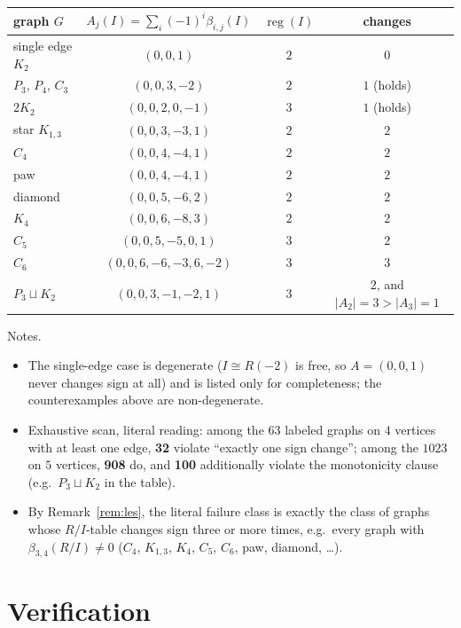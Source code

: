 \documentclass[11pt]{article}
\begin{document}
\begin{center}
\begin{tabular}{lccc}
\toprule
graph $G$ & $A_j(I)=\sum_i(-1)^i\beta_{i,j}(I)$ & $\operatorname{reg}(I)$ & changes \\
\midrule
single edge $K_2$ & $(0,0,1)$ & $2$ & $0$ \\
$P_3$, $P_4$, $C_3$ & $(0,0,3,-2)$ & $2$ & $1$ (holds) \\
$2K_2$ & $(0,0,2,0,-1)$ & $3$ & $1$ (holds) \\
star $K_{1,3}$ & $(0,0,3,-3,1)$ & $2$ & $2$ \\
$C_4$ & $(0,0,4,-4,1)$ & $2$ & $2$ \\
paw & $(0,0,4,-4,1)$ & $2$ & $2$ \\
diamond & $(0,0,5,-6,2)$ & $2$ & $2$ \\
$K_4$ & $(0,0,6,-8,3)$ & $2$ & $2$ \\
$C_5$ & $(0,0,5,-5,0,1)$ & $3$ & $2$ \\
$C_6$ & $(0,0,6,-6,-3,6,-2)$ & $3$ & $3$ \\
$P_3\sqcup K_2$ & $(0,0,3,-1,-2,1)$ & $3$ & $2$, and $|A_2|{=}3>|A_3|{=}1$ \\
\bottomrule
\end{tabular}
\end{center}

Notes.
\begin{itemize}
\item The single-edge case is degenerate ($I\cong R(-2)$ is free, so
$A=(0,0,1)$ never changes sign at all) and is listed only for completeness;
the counterexamples above are non-degenerate.
\item Exhaustive scan, literal reading: among the $63$ labeled graphs on
$4$ vertices with at least one edge, \textbf{32} violate ``exactly one
sign change''; among the $1023$ on $5$ vertices, \textbf{908} do, and
\textbf{100} additionally violate the monotonicity clause (e.g.\
$P_3\sqcup K_2$ in the table).
\item By Remark~\ref{rem:les}, the literal failure class is exactly the
class of graphs whose $R/I$-table changes sign three or more times, e.g.\
every graph with $\beta_{3,4}(R/I)\neq0$ ($C_4$, $K_{1,3}$, $K_4$,
$C_5$, $C_6$, paw, diamond, \dots).
\end{itemize}

\section{Verification}
\label{sec:verif}
\end{document}
